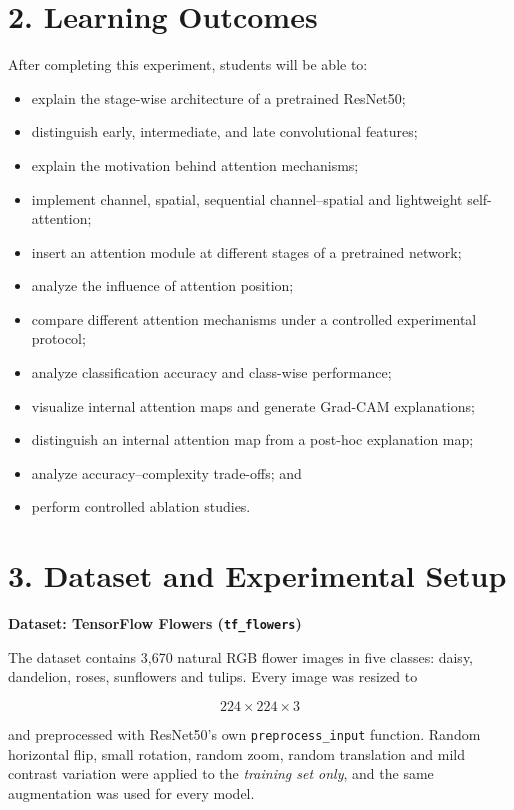 \documentclass[10pt]{article}
\begin{document}
\section*{2. Learning Outcomes}

After completing this experiment, students will be able to:

\begin{itemize}
\item explain the stage-wise architecture of a pretrained ResNet50;
\item distinguish early, intermediate, and late convolutional features;
\item explain the motivation behind attention mechanisms;
\item implement channel, spatial, sequential channel--spatial and lightweight self-attention;
\item insert an attention module at different stages of a pretrained network;
\item analyze the influence of attention position;
\item compare different attention mechanisms under a controlled experimental protocol;
\item analyze classification accuracy and class-wise performance;
\item visualize internal attention maps and generate Grad-CAM explanations;
\item distinguish an internal attention map from a post-hoc explanation map;
\item analyze accuracy--complexity trade-offs; and
\item perform controlled ablation studies.
\end{itemize}

\section*{3. Dataset and Experimental Setup}

\textbf{Dataset: TensorFlow Flowers (\texttt{tf\_flowers})}

The dataset contains 3{,}670 natural RGB flower images in five classes:
daisy, dandelion, roses, sunflowers and tulips. Every image was resized to

\[
224\times224\times3
\]

and preprocessed with ResNet50's own \texttt{preprocess\_input} function.
Random horizontal flip, small rotation, random zoom, random translation and
mild contrast variation were applied to the \emph{training set only}, and
the same augmentation was used for every model.
\end{document}
